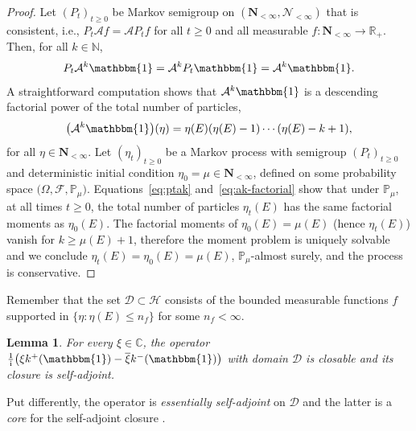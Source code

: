 \documentclass[pdftex]{sigma}
\numberwithin{equation}{section}
\newtheorem{Lemma}[Theorem]{Lemma}
\newcommand{\N}{\mathbb{N}}
\newcommand{\R}{\mathbb{R}}
\newcommand{\C}{\mathbb{C}}
\renewcommand{\P}{\mathbb{P}}
\newcommand{\one}{\mathbbm{1}}
\newcommand{\1}{\mathbbm{1}}
\begin{document}
\begin{proof}
	Let $(P_t)_{t\geq 0}$ be Markov semigroup on $(\mathbf N_{<\infty}, \mathcal N_{<\infty})$ that is consistent, i.e., $P_t \mathcal A f = \mathcal A P_t f$ for all $t\geq 0$ and all measurable $f\colon \mathbf N_{<\infty} \to \R_+$. Then, for all $k\in \N$,
	\begin{equation} \label{eq:ptak}
		P_t \mathcal A^k \one = \mathcal A^k P_t \one = \mathcal A^k \one.
	\end{equation}
	A straightforward computation shows that $\mathcal A^k\one$ is a descending factorial power of the total number of particles,
	\begin{equation} \label{eq:ak-factorial}
		\bigl( \mathcal A^k \one \bigr)(\eta) = \eta(E)( \eta(E)-1) \cdots ( \eta(E) - k +1),
	\end{equation}
	for all $\eta \in \mathbf N_{<\infty}$. Let $(\eta_t)_{t\geq 0}$ be a Markov process with semigroup $(P_t)_{t\geq 0}$ and deterministic initial condition $\eta_0=\mu \in \mathbf N_{<\infty}$, defined on some probability space $\bigl(\Omega,\mathscr F, \mathbb P_\mu\bigr)$. Equations~\eqref{eq:ptak} and~\eqref{eq:ak-factorial} show that under $\mathbb P_\mu$, at all times $t\geq 0$, the total number of particles $\eta_t(E)$ has the same factorial moments as $\eta_0(E)$. The factorial moments of $\eta_0(E) = \mu(E)$ (hence $\eta_t(E)$) vanish for $k\geq \mu(E)+1$, therefore the moment problem is uniquely solvable and we conclude $\eta_t(E) = \eta_0(E) = \mu(E)$, $\P_\mu$-almost surely, and the process is conservative.
\end{proof}

Remember that the set $\mathcal D\subset \mathcal H$ consists of the bounded measurable functions $f$ supported in $\{\eta\colon \eta(E)\leq n_f\}$ for some $n_f<\infty$.

\begin{Lemma} \label{lem:closure}
	For every $\xi \in \C$, the operator $\frac{1}{\mathrm i} \bigl( \xi k^+(\1) - \overline{\xi} k^-(\1)\bigr)$ with domain $\mathcal D$ is closable and its closure is self-adjoint.
\end{Lemma}

Put differently, the operator is \emph{essentially self-adjoint} on $\mathcal D$ and the latter is a \emph{core} for the self-adjoint closure \cite[Section VIII.2]{reedSimonI}.
\end{document}
